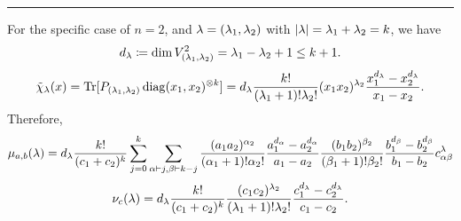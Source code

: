 \documentclass[notitlepage, 10pt]{article}
\begin{document}
\hrule
    For the specific case of $n =2$, and $\lambda = (\lambda_1, \lambda_2)$ with ${|\lambda|} = \lambda_1 + \lambda_2 = k$, we have
    \begin{equation}
        d_\lambda \coloneqq \dim V_{(\lambda_1,\lambda_2)}^{2} = \lambda_1 - \lambda_2 + 1 \leq k+1.
    \end{equation}
    \begin{equation}
        \tilde \chi_{\lambda}(x) = \operatorname{Tr}[P_{(\lambda_1,\lambda_2)} \operatorname{diag}(x_1,x_2)^{\otimes k}] = d_{\lambda}\frac{k!}{(\lambda_1+1)!\lambda_2!} (x_1x_2)^{\lambda_2} \frac{x_1^{d_\lambda} - x_2^{d_\lambda}}{x_1 - x_2}.
    \end{equation}
    Therefore, 
    \begin{equation}
        \mu_{a,b}(\lambda) = d_{\lambda}\frac{k!}{(c_1+c_2)^k} \sum_{j=0}^{k} \sum_{\alpha\vdash j,\beta \vdash k-j} \frac{(a_1a_2)^{\alpha_2}}{(\alpha_1+1)!\alpha_2!} \frac{a_1^{d_\alpha} - a_2^{d_\alpha}}{a_1 - a_2}\frac{ (b_1b_2)^{\beta_2}}{(\beta_1+1)!\beta_2!} \frac{b_1^{d_\beta} - b_2^{d_\beta}}{b_1 - b_2}c^{\lambda}_{\alpha\beta}
    \end{equation}
    \begin{equation}
        \nu_{c}(\lambda) = d_{\lambda}\frac{k!}{(c_1+c_2)^k}\frac{(c_1c_2)^{\lambda_2}}{(\lambda_1+1)!\lambda_2!}  \frac{c_1^{d_\lambda} - c_2^{d_\lambda}}{c_1 - c_2}.
    \end{equation}
\end{document}
